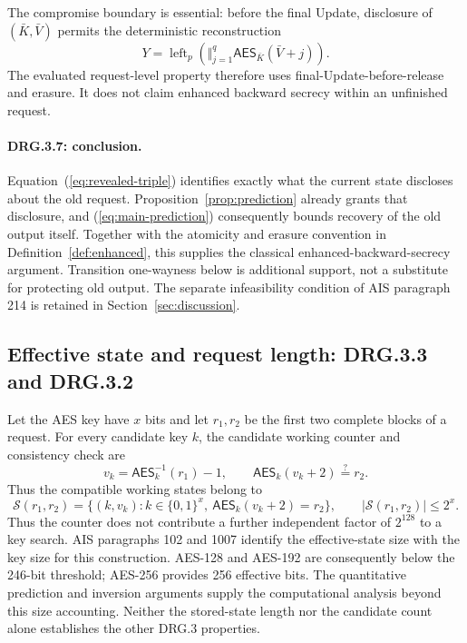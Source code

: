 \documentclass[journal=tosc,preprint,floatrow,nohyperxmp]{iacrtrans}
\newif\ifjordireview
\newcounter{jordinote}
\newcommand{\jordinote}[2]{%
  \ifjordireview
  \stepcounter{jordinote}\par\medskip\noindent
  \fcolorbox{blue!55!black}{blue!4}{%
    \begin{minipage}{\dimexpr\linewidth-2\fboxsep-2\fboxrule\relax}
    \small\raggedright\color{blue!45!black}
    \textbf{Solo Jordi -- J\thejordinote: #1}\par\smallskip
    #2
    \end{minipage}}\par\medskip
  \fi
}
\numberwithin{lemma}{section}
\numberwithin{proposition}{section}
\newcommand{\bits}{\{0,1\}}
\newcommand{\Enc}{\mathsf{AES}}
\numberwithin{equation}{section}
\theoremstyle{definition}
\numberwithin{definition}{section}
\theoremstyle{plain}
\begin{document}
The compromise boundary is essential: before the final Update, disclosure of $(\bar K,\bar V)$ permits the deterministic reconstruction
\[
 Y=\operatorname{left}_p\left(\big\Vert_{j=1}^q\Enc_{\bar K}(\bar V+j)\right).
\]
The evaluated request-level property therefore uses final-Update-before-release and erasure. It does not claim enhanced backward secrecy within an unfinished request.

\paragraph{DRG.3.7: conclusion.}
Equation~(\ref{eq:revealed-triple}) identifies exactly what the current state discloses about the old request. Proposition~\ref{prop:prediction} already grants that disclosure, and (\ref{eq:main-prediction}) consequently bounds recovery of the old output itself. Together with the atomicity and erasure convention in Definition~\ref{def:enhanced}, this supplies the classical enhanced-backward-secrecy argument. Transition one-wayness below is additional support, not a substitute for protecting old output. The separate infeasibility condition of AIS paragraph 214 is retained in Section~\ref{sec:discussion}.

\jordinote{Por qué .7 necesita proteger salida y no solo estado}{El BSI argumenta desde Update y el comportamiento seudoaleatorio. Aquí intentamos hacer explícito el paso que interesa: con el estado final revelado, seguir sin poder reconstruir las salidas anteriores. La unidireccionalidad de la transición no sustituye ese objetivo. Revisa el orden Update--uso y el borrado; si se compromete el estado de trabajo antes del Update, la reconstrucción mostrada sí es posible.}

\subsection{Effective state and request length: DRG.3.3 and DRG.3.2}\label{sec:remaining}
Let the AES key have $x$ bits and let $r_1,r_2$ be the first two complete blocks of a request. For every candidate key $k$, the candidate working counter and consistency check are
\begin{equation}
 v_k=\Enc_k^{-1}(r_1)-1,\qquad
 \Enc_k(v_k+2)\stackrel{?}=r_2.\label{eq:key-candidate}
\end{equation}
Thus the compatible working states belong to
\[
 \mathcal S(r_1,r_2)=
 \{(k,v_k):k\in\bits^x,\ \Enc_k(v_k+2)=r_2\},
 \qquad |\mathcal S(r_1,r_2)|\le2^x.
\]
Thus the counter does not contribute a further independent factor of $2^{128}$ to a key search. AIS paragraphs 102 and 1007 identify the effective-state size with the key size for this construction. AES-128 and AES-192 are consequently below the 246-bit threshold; AES-256 provides 256 effective bits. The quantitative prediction and inversion arguments supply the computational analysis beyond this size accounting. Neither the stored-state length nor the candidate count alone establishes the other DRG.3 properties.
\end{document}
